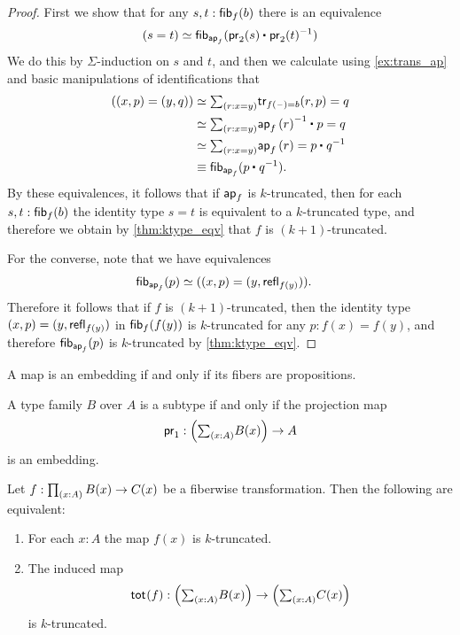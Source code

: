 \begin{proof}
First we show that for any $s,t:\mathsf{fib}_{f}(b)$ there is an equivalence
\begin{equation*}
\eqv{(s=t)}{\fib{\apfunc{f}}{\ct{\proj 2(s)}{\proj 2(t)^{-1}}}}
\end{equation*}
We do this by $\Sigma$-induction on $s$ and $t$, and then we calculate using \cref{ex:trans_ap} and basic manipulations of identifications that
\begin{align*}
(\pairr{x,p}=\pairr{y,q}) & \eqvsym \sm{r:x=y} \mathsf{tr}_{f(\blank)=b}(r,p)=q \\
& \eqvsym \sm{r:x=y} \ct{\ap{f}{r}^{-1}}{p}=q \\
& \eqvsym \sm{r:x=y} \ap{f}{r}=\ct{p}{q^{-1}} \\
& \jdeq \fib{\apfunc{f}}{\ct{p}{q^{-1}}}.
\end{align*}
By these equivalences, it follows that if $\mathsf{ap}_{f}$ is $k$-truncated, then for each $s,t:\mathsf{fib}_{f}(b)$ the identity type $s=t$ is equivalent to a $k$-truncated type, and therefore we obtain by \cref{thm:ktype_eqv} that $f$ is $(k+1)$-truncated.

For the converse, note that we have equivalences
\begin{align*}
\mathsf{fib}_{\mathsf{ap}_{f}}(p) & \simeq ((x,p)=(y,\mathsf{refl}_{f(y)})).
\end{align*}
Therefore it follows that if $f$ is $(k+1)$-truncated, then the identity type $(x,p)=(y,\mathsf{refl}_{f(y)})$ in $\mathsf{fib}_{f}(f(y))$ is $k$-truncated for any $p:f(x)=f(y)$, and therefore $\mathsf{fib}_{\mathsf{ap}_{f}}(p)$ is $k$-truncated by \cref{thm:ktype_eqv}. 
\end{proof}

\begin{cor}\label{cor:prop_emb}
A map is an embedding if and only if its fibers are propositions.
\end{cor}

\begin{cor}\label{thm:subtype}
A type family $B$ over $A$ is a subtype if and only if the projection map
\begin{equation*}
\proj 1 : \Big(\sm{x:A}B(x)\Big)\to A
\end{equation*}
is an embedding.
\end{cor}

\begin{thm}
Let $f:\prd{x:A}B(x)\to C(x)$ be a fiberwise transformation. Then the following are equivalent:
\begin{enumerate}
\item For each $x:A$ the map $f(x)$ is $k$-truncated.
\item The induced map 
\begin{equation*}
\total{f}:\Big(\sm{x:A}B(x)\Big)\to\Big(\sm{x:A}C(x)\Big)
\end{equation*}
is $k$-truncated.
\end{enumerate}
\end{thm}

